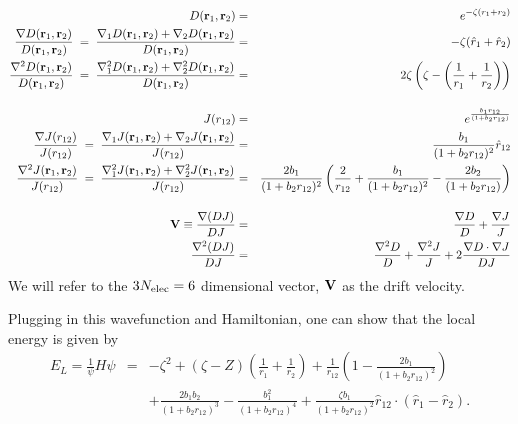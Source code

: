 \documentclass[11pt,aps,prb,amsmath,amssymb,superscriptaddress,notitlepage]{revtex4-1}
\def\beq{\begin{eqnarray}}
\def\eeq{\end{eqnarray}}
\def\rvec{{\bf r}}
\def\Vvec{{\bf V}}
\def\rhat{\hat{r}}
\begin{document}
\beq
D(\rvec_1,\rvec_2) &=& e^{-\zeta(r_1+r_2)} \\
{\nabla D(\rvec_1,\rvec_2) \over D(\rvec_1,\rvec_2)} \;=\; {\nabla_1 D(\rvec_1,\rvec_2) + \nabla_2 D(\rvec_1,\rvec_2) \over D(\rvec_1,\rvec_2)}
&=& -\zeta (\rhat_1+\rhat_2) \\
{\nabla^2 D(\rvec_1,\rvec_2) \over D(\rvec_1,\rvec_2)} \;=\; {\nabla^2_1 D(\rvec_1,\rvec_2) + \nabla^2_2 D(\rvec_1,\rvec_2) \over D(\rvec_1,\rvec_2)}
&=& 2\zeta\left(\zeta -\left({1 \over r_1}+{1 \over r_2}\right)\right) \\[4mm]
J(r_{12}) &=& e^{b_1 r_{12} \over (1+b_2 r_{12})} \\
{\nabla J(r_{12}) \over J(r_{12})} \;=\; {\nabla_1 J(\rvec_1,\rvec_2) + \nabla_2 J(\rvec_1,\rvec_2) \over J(r_{12})}
&=& {b_1 \over (1+b_2 r_{12})^2} \rhat_{12} \\
{\nabla^2 J(\rvec_1,\rvec_2) \over J(r_{12})} \;=\; {\nabla^2_1 J(\rvec_1,\rvec_2) + \nabla^2_2 J(\rvec_1,\rvec_2) \over J(r_{12})}
&=& {2 b_1 \over (1+b_2 r_{12})^2} \left({2 \over r_{12}} + {b_1 \over (1+b_2 r_{12})^2} - {2 b_2 \over (1+b_2 r_{12})} \right) \\[4mm]
\label{drift}
\Vvec \equiv {{\bf\nabla} (D J) \over D J} &=& {{\bf \nabla} D \over D} + {{\bf \nabla} J \over J} \\
{\nabla^2 (D J) \over D J} &=& {\nabla^2 D \over D} + {\nabla^2 J \over J}
+ 2 {{\bf\nabla} D \cdot {\bf \nabla} J \over D J}
\eeq
We will refer to the $3N_{\rm elec} = 6$ dimensional vector, $\Vvec$ as the drift velocity.

Plugging in this wavefunction and Hamiltonian, one can show that the
local energy is given by
\beq
E_{L}=\frac{1}{\psi}H\psi & = & -\zeta ^{2}+\left(\zeta -Z\right)\left(\frac{1}{r_{1}}+\frac{1}{r_{2}}\right)+\frac{1}{r_{12}}\left(1-\frac{2b_1}{\left(1+b_2 r_{12}\right)^{2}}\right) \nonumber \\
 &  & +\frac{2b_1 b_2}{\left(1+b_2 r_{12}\right)^{3}}-\frac{b_1^{2}}{\left(1+b_2 r_{12}\right)^{4}}+\frac{\zeta b_1}{\left(1+b_2 r_{12}\right)^{2}}\hat{r}_{12}\cdot\left(\hat{r}_{1}-\hat{r}_{2}\right).
\label{E_local}
\eeq
\end{document}
